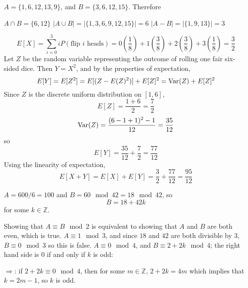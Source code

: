 \documentclass[12pt,twoside]{article}
\begin{document}

\begin{problems}

\problem  $A = \{ 1, 6, 12, 13, 9 \}$, and $B = \{ 3, 6, 12, 15 \}$. Therefore

\begin{problemparts}
\problempart $A \cap B = \{ 6, 12 \}$
\problempart $|A \cup B| = |\{ 1, 3, 6, 9, 12, 15 \}| = 6$
\problempart $|A - B| = |\{ 1, 9, 13 \}| = 3$
\end{problemparts}

\problem  %

\begin{problemparts}
\problempart
$$
E[X] = \sum_{i = 0}^3 iP(\text{flip }i\text{ heads}) = 0\left(\frac{1}{8}\right) + 1\left(\frac{3}{8}\right) + 2\left(\frac{3}{8}\right) + 3\left(\frac{1}{8}\right) = \frac{3}{2}
$$
\problempart Let $Z$ be the random variable representing the outcome of rolling one fair six-sided dice. Then $Y = X^2$, and by the properties of expectation,
$$
E[Y] = E[Z^2] = E[(Z - E(Z)^2)] + E[Z]^2 = \mathop{\rm Var}\nolimits(Z) + E[Z]^2
$$
Since $Z$ is the discrete uniform distribution on $[1, 6]$, 
$$
E[Z] = \frac{1 + 6}{2} = \frac{7}{2}
$$
$$
\mathop{\rm Var}\nolimits(Z) = \frac{(6 - 1 + 1)^2 - 1}{12} = \frac{35}{12}
$$
so 
$$
E[Y] = \frac{35}{12} + \frac{7}{2} = \frac{77}{12}
$$
\problempart Using the linearity of expectation,
$$
E[X + Y] = E[X] + E[Y] = \frac{3}{2} + \frac{77}{12} = \frac{95}{12}
$$
\end{problemparts}

\problem $A = 600/6 = 100$ and $B = 60 \mod 42 = 18 \mod 42$, so
$$
B = 18 + 42k
$$
for some $k \in \mathbb{Z}$.

\begin{problemparts}
\problempart Showing that $A \equiv B \mod 2$ is equivalent to showing that $A$ and $B$ are both even, which is true.
\problempart $A \equiv 1 \mod 3$, and since $18$ and $42$ are both divisible by $3$, $B \equiv 0 \mod 3$ so this is false.
\problempart $A \equiv 0 \mod 4$, and $B \equiv 2 + 2k \mod 4$; the right hand side is $0$ if and only if $k$ is odd:

$\Rightarrow$: if $2 + 2k \equiv 0 \mod 4$, then for some $m \in \mathbb{Z}$, $2 + 2k = 4m$ which implies that $k = 2m - 1$, so $k$ is odd.


\end{problemparts}
\end{problems}
\end{document}

